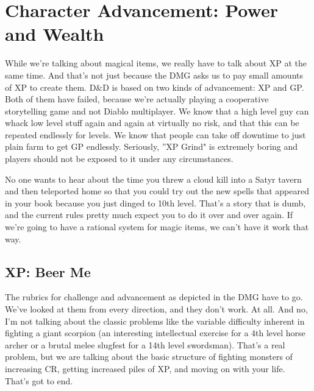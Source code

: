 \section{Character Advancement: Power and Wealth}
\vspace*{-8pt}

While we're talking about magical items, we really have to talk about XP at the same time. And that's not just because the DMG asks us to pay small amounts of XP to create them. D\&D is based on two kinds of advancement: XP and GP. Both of them have failed, because we're actually playing a cooperative storytelling game and not Diablo multiplayer. We know that a high level guy can whack low level stuff again and again at virtually no risk, and that this can be repeated endlessly for levels. We know that people can take off downtime to just plain farm to get GP endlessly. Seriously, ''XP Grind" is extremely boring and players should not be exposed to it under any circumstances.

No one wants to hear about the time you threw a cloud kill into a Satyr tavern and then teleported home so that you could try out the new spells that appeared in your book because you just dinged to 10th level. That's a story that is dumb, and the current rules pretty much expect you to do it over and over again. If we're going to have a rational system for magic items, we can't have it work that way.

\subsection{XP: Beer Me}
\vspace*{-8pt}

The rubrics for challenge and advancement as depicted in the DMG have to go. We've looked at them from every direction, and they don't work. At all. And no, I'm not talking about the classic problems like the variable difficulty inherent in fighting a giant scorpion (an interesting intellectual exercise for a 4th level horse archer or a brutal melee slugfest for a 14th level swordsman). That's a real problem, but we are talking about the basic structure of fighting monsters of increasing CR, getting increased piles of XP, and moving on with your life. That's got to end.

